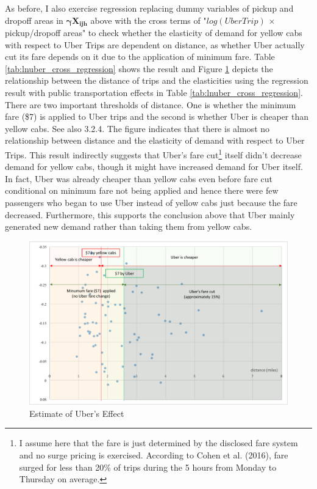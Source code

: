 \indent As before, I also exercise regression replacing dummy variables of pickup and dropoff areas in $\mathbf{\bm{\gamma} X_{ijh}}$ above with the cross terms of "$log (Uber Trip)$ $\times$ pickup/dropoff areas" to check whether the elasticity of demand for yellow cabs with respect to Uber Trips are dependent on distance, as whether Uber actually cut its fare depends on it due to the application of minimum fare. Table \ref{tab:lnuber_cross_regression} shows the result and Figure \ref{fig:elasticity_lnuber} depicts the relationship between the distance of trips and the elasticities using the regression result with public transportation effects in Table \ref{tab:lnuber_cross_regression}. There are two important thresholds of distance. One is whether the minimum fare (\$7) is applied to Uber trips and the second is whether Uber is cheaper than yellow cabs. See also 3.2.4. The figure indicates that there is almost no relationship between distance and the elasticity of demand with respect to Uber Trips. This result indirectly suggests that Uber's fare cut\footnote{I assume here that the fare is just determined by the disclosed fare system and no surge pricing is exercised. According to Cohen et al. (2016), fare surged for less than 20\% of trips during the 5 hours from Monday to Thursday on average.} itself didn't decrease demand for yellow cabs, though it might have increased demand for Uber itself. In fact, Uber was already cheaper than yellow cabs even before fare cut conditional on minimum fare not being applied and hence there were few passengers who began to use Uber instead of yellow cabs just because the fare decreased. Furthermore, this supports the conclusion above that Uber mainly generated new demand rather than taking them from yellow cabs. 

\begin{figure}[h]
\centering
\caption{Estimate of Uber's Effect}\label{fig:elasticity_lnuber}
\vspace{0.2cm}
\includegraphics[width=16.5cm]{Figures/elasticity_lnuber.png}
\end{figure}



